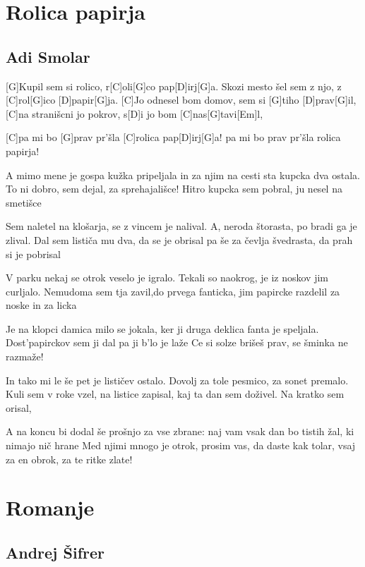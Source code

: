 \documentclass[a4paper,12pt]{article}
\begin{document}
\begin{multicols}{2}
\begin{guitar}
\end{guitar}
\section{Rolica papirja}
\subsection*{Adi Smolar}
\begin{guitar}

[G]Kupil sem si rolico, r[C]oli[G]co pap[D]irj[G]a. 
Skozi mesto šel sem z njo, z [C]rol[G]ico [D]papir[G]ja. 
[C]Jo odnesel bom domov, sem si [G]tiho [D]prav[G]il,
[C]na stranišcni jo pokrov, s[D]i jo bom [C]nas[G]tavi[Em]l, 
   
   
[C]pa mi bo [G]prav pr'šla [C]rolica pap[D]irj[G]a! 
pa mi bo prav pr'šla rolica papirja! 


A mimo mene je gospa kužka pripeljala 
in za njim na cesti sta kupcka dva ostala. 
To ni dobro, sem dejal, za sprehajališce! 
Hitro kupcka sem pobral, ju nesel na smetišce 


Sem naletel na klošarja, se z vincem je nalival. 
A, neroda štorasta, po bradi ga je zlival. 
Dal sem lističa mu dva, da se je obrisal 
pa še za čevlja švedrasta, da prah si je pobrisal 

   
V parku nekaj se otrok veselo je igralo. 
Tekali so naokrog, je iz noskov jim curljalo. 
Nemudoma sem tja zavil,do prvega fanticka, 
jim papircke razdelil za noske in za licka 

   
Je na klopci damica milo se jokala, 
ker ji druga deklica fanta je speljala. 
Dost'papirckov sem ji dal pa ji b'lo je laže 
Ce si solze brišeš prav, se šminka ne razmaže! 

   
In tako mi le še pet je lističev ostalo. 
Dovolj za tole pesmico, za sonet premalo. 
Kuli sem v roke vzel, na listice zapisal, 
kaj ta dan sem doživel. Na kratko sem orisal, 


A na koncu bi dodal še prošnjo za vse zbrane: 
naj vam vsak dan bo tistih žal, ki nimajo nič hrane 
Med njimi mnogo je otrok, prosim vas, da daste 
kak tolar, vsaj za en obrok, za te ritke zlate!

\end{guitar}
\section{Romanje}
\subsection*{Andrej Šifrer}
\begin{guitar}


\end{guitar}
\end{multicols}
\end{document}
